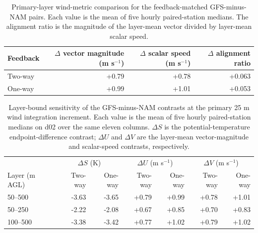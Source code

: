 \documentclass[air,article,submit,moreauthors]{Definitions/mdpi}
\begin{document}
\begin{table}[H]
\caption{Primary-layer wind-metric comparison for the feedback-matched GFS-minus-NAM pairs.
Each value is the mean of five hourly paired-station medians.
The alignment ratio is the magnitude of the layer-mean vector divided by layer-mean scalar speed.}
\label{tab:v3-wind-cancellation}
\centering
\begin{tabular}{lrrr}
\toprule
Feedback & $\Delta$ vector magnitude (m s$^{-1}$) & $\Delta$ scalar speed (m s$^{-1}$) & $\Delta$ alignment ratio \\
\midrule
Two-way & +0.79 & +0.78 & +0.063 \\
One-way & +0.99 & +1.01 & +0.053 \\
\bottomrule
\end{tabular}
\end{table}

\begin{table}[H]
\caption{Layer-bound sensitivity of the GFS-minus-NAM contrasts at the primary 25 m wind integration increment.
Each value is the mean of five hourly paired-station medians on d02 over the same eleven columns.
$\Delta S$ is the potential-temperature endpoint-difference contrast; $\Delta U$ and $\Delta V$ are the layer-mean vector-magnitude and scalar-speed contrasts, respectively.}
\label{tab:v3-layer-sensitivity}
\centering
\small
\begin{tabular}{lrrrrrr}
\toprule
& \multicolumn{2}{c}{$\Delta S$ (K)} & \multicolumn{2}{c}{$\Delta U$ (m s$^{-1}$)} & \multicolumn{2}{c}{$\Delta V$ (m s$^{-1}$)} \\
Layer (m AGL) & Two-way & One-way & Two-way & One-way & Two-way & One-way \\
\midrule
50--500 & -3.63 & -3.65 & +0.79 & +0.99 & +0.78 & +1.01 \\
50--250 & -2.22 & -2.08 & +0.67 & +0.85 & +0.70 & +0.83 \\
100--500 & -3.38 & -3.42 & +0.77 & +1.02 & +0.79 & +1.02 \\
\bottomrule
\end{tabular}
\end{table}
\end{document}
